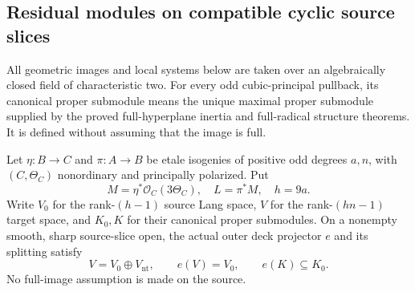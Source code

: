 \subsection{Residual modules on compatible cyclic source slices}

All geometric images and local systems below are taken over an
algebraically closed field of characteristic two. For every odd
cubic-principal pullback, its canonical proper submodule means
the unique maximal proper submodule supplied by the proved
full-hyperplane inertia and full-radical structure theorems.
It is defined without assuming that the image is full.

\begin{lemma}
\label{lem:DE-source-residual-projection}
Let \(\eta:B\to C\) and \(\pi:A\to B\) be etale isogenies
of positive odd degrees \(a,n\), with \((C,\Theta_C)\)
nonordinary and principally polarized. Put
\[
 M=\eta^*\mathcal O_C(3\Theta_C),\quad L=\pi^*M,
 \quad h=9a.
 \tag{DE-CR1}
\]
Write \(V_0\) for the rank-\((h-1)\) source Lang space,
\(V\) for the rank-\((hn-1)\) target space, and \(K_0,K\)
for their canonical proper submodules. On a nonempty smooth,
sharp source-slice open, the actual outer deck projector \(e\)
and its splitting satisfy
\[
        V=V_0\oplus V_{\mathrm{nt}},\qquad
        e(V)=V_0,\qquad e(K)\subseteq K_0.
 \tag{DE-CR2}
\]
No full-image assumption is made on the source.
\end{lemma}
